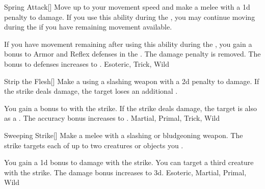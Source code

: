 \lowercase{\hypertarget{maneuver:Spring Attack}{}}\label{maneuver:Spring Attack}
\hypertarget{maneuver:Spring Attack}{}
\begin{freeability}{Spring Attack}[]
Move up to your movement speed and make a melee  with a \minus1d penalty to damage.
If you use this ability during the , you may continue moving during the  if you have remaining movement available.

\rankline
{} If you have movement remaining after using this ability during the ,
you gain a  bonus to Armor and Reflex defenses in the .
 The damage penalty is removed.
 The bonus to defenses increases to .
 Esoteric, Trick, Wild
\end{freeability}
\vspace{0.25em}



\lowercase{\hypertarget{maneuver:Strip the Flesh}{}}\label{maneuver:Strip the Flesh}
\hypertarget{maneuver:Strip the Flesh}{}
\begin{freeability}{Strip the Flesh}[]
Make a  using a slashing weapon with a \minus2d penalty to damage.
If the strike deals damage, the target loses an additional .

\rankline
{} You gain a  bonus to  with the strike.
 If the strike deals damage, the target is also  as a .
 The accuracy bonus increases to .
 Martial, Primal, Trick, Wild
\end{freeability}
\vspace{0.25em}



\lowercase{\hypertarget{maneuver:Sweeping Strike}{}}\label{maneuver:Sweeping Strike}
\hypertarget{maneuver:Sweeping Strike}{}
\begin{freeability}{Sweeping Strike}[]
Make a melee  with a slashing or bludgeoning weapon.
The strike targets each of up to two creatures or objects you .

\rankline
{} You gain a \plus1d bonus to damage with the strike.
 You can target a third creature with the strike.
 The damage bonus increases to \plus3d.
 Esoteric, Martial, Primal, Wild
\end{freeability}
\vspace{0.25em}




